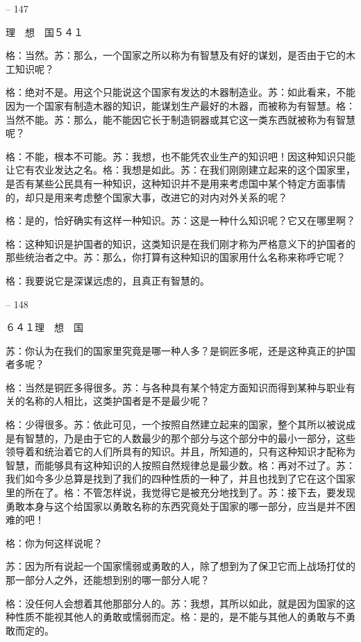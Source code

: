 \documentclass[11pt,oneside]{book}
\begin{document}
\begin{common-format}
    

-- 147

    理　想　国５４１

    格：当然。苏：那么，一个国家之所以称为有智慧及有好的谋划，是否由于它的木工知识呢？

    格：绝对不是。用这个只能说这个国家有发达的木器制造业。苏：如此看来，不能因为一个国家有制造木器的知识，能谋划生产最好的木器，而被称为有智慧。格：当然不能。苏：那么，能不能因它长于制造铜器或其它这一类东西就被称为有智慧呢？

    格：不能，根本不可能。苏：我想，也不能凭农业生产的知识吧！因这种知识只能让它有农业发达之名。格：我想是如此。苏：在我们刚刚建立起来的这个国家里，是否有某些公民具有一种知识，这种知识并不是用来考虑国中某个特定方面事情的，却只是用来考虑整个国家大事，改进它的对内对外关系的呢？

    格：是的，恰好确实有这样一种知识。苏：这是一种什么知识呢？它又在哪里啊？

    格：这种知识是护国者的知识，这类知识是在我们刚才称为严格意义下的护国者的那些统治者之中。苏：那么，你打算有这种知识的国家用什么名称来称呼它呢？

    格：我要说它是深谋远虑的，且真正有智慧的。

    

-- 148

    ６４１理　想　国

    苏：你认为在我们的国家里究竟是哪一种人多？是铜匠多呢，还是这种真正的护国者多呢？

    格：当然是铜匠多得很多。苏：与各种具有某个特定方面知识而得到某种与职业有关的名称的人相比，这类护国者是不是最少呢？

    格：少得很多。苏：依此可见，一个按照自然建立起来的国家，整个其所以被说成是有智慧的，乃是由于它的人数最少的那个部分与这个部分中的最小一部分，这些领导着和统治着它的人们所具有的知识。并且，所知道的，只有这种知识才配称为智慧，而能够具有这种知识的人按照自然规律总是最少数。格：再对不过了。苏：我们如今多少总算是找到了我们的四种性质的一种了，并且也找到了它在这个国家里的所在了。格：不管怎样说，我觉得它是被充分地找到了。苏：接下去，要发现勇敢本身与这个给国家以勇敢名称的东西究竟处于国家的哪一部分，应当是并不困难的吧！

    格：你为何这样说呢？

    苏：因为所有说起一个国家懦弱或勇敢的人，除了想到为了保卫它而上战场打仗的那一部分人之外，还能想到别的哪一部分人呢？

    格：没任何人会想着其他那部分人的。苏：我想，其所以如此，就是因为国家的这种性质不能视其他人的勇敢或懦弱而定。格：是的，是不能与其他人的勇敢与不勇敢而定的。


\end{common-format}
\end{document}
